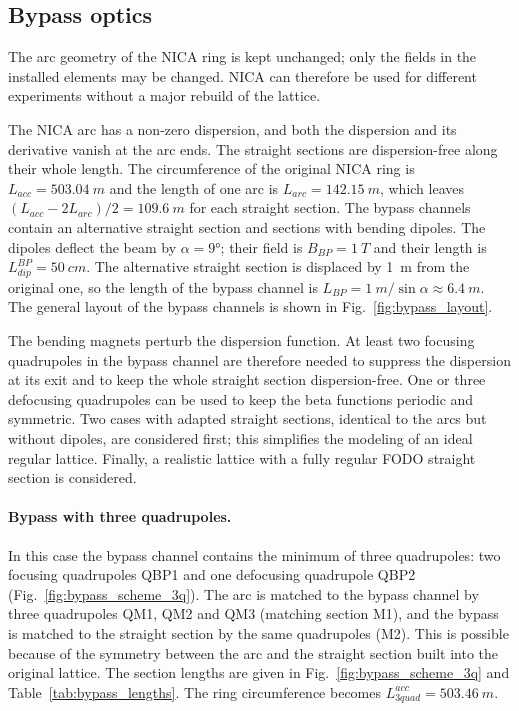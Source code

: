 \documentclass[%
  aps,
  pra,
  preprint,
  a4paper,
  amsmath,
  amssymb,
  floatfix,
  longbibliography,
  superscriptaddress
]{revtex4-2}
\begin{document}
\subsection{Bypass optics}

The arc geometry of the NICA ring is kept unchanged; only the fields in the
installed elements may be changed. NICA can therefore be used for different
experiments without a major rebuild of the lattice.

The NICA arc has a non-zero dispersion, and both the dispersion and its
derivative vanish at the arc ends. The straight sections are dispersion-free
along their whole length. The circumference of the original NICA ring is
$L_{acc} = \SI{503.04}{m}$ and the length of one arc is
$L_{arc} = \SI{142.15}{m}$, which leaves
$(L_{acc}-2L_{arc})/2 = \SI{109.6}{m}$ for each straight section. The bypass
channels contain an alternative straight section and sections with bending
dipoles. The dipoles deflect the beam by $\alpha = \ang{9}$; their field is
$B_{BP} = \SI{1}{T}$ and their length is $L^{BP}_{dip} = \SI{50}{cm}$. The
alternative straight section is displaced by \SI{1}{m} from the original one,
so the length of the bypass channel is
$L_{BP} = \SI{1}{m}/\sin\alpha \approx \SI{6.4}{m}$. The general layout of
the bypass channels is shown in Fig.~\ref{fig:bypass_layout}.

The bending magnets perturb the dispersion function. At least two focusing
quadrupoles in the bypass channel are therefore needed to suppress the
dispersion at its exit and to keep the whole straight section
dispersion-free. One or three defocusing quadrupoles can be used to keep the
beta functions periodic and symmetric. Two cases with adapted straight
sections, identical to the arcs but without dipoles, are considered first;
this simplifies the modeling of an ideal regular lattice. Finally, a
realistic lattice with a fully regular FODO straight section is considered.

\paragraph{Bypass with three quadrupoles.}
In this case the bypass channel contains the minimum of three quadrupoles: two
focusing quadrupoles QBP1 and one defocusing quadrupole QBP2
(Fig.~\ref{fig:bypass_scheme_3q}). The arc is matched to the bypass channel by
three quadrupoles QM1, QM2 and QM3 (matching section M1), and the bypass is
matched to the straight section by the same quadrupoles (M2). This is possible
because of the symmetry between the arc and the straight section built into
the original lattice. The section lengths are given in
Fig.~\ref{fig:bypass_scheme_3q} and Table~\ref{tab:bypass_lengths}. The ring
circumference becomes $L^{acc}_{3quad} = \SI{503.46}{m}$.
\end{document}
